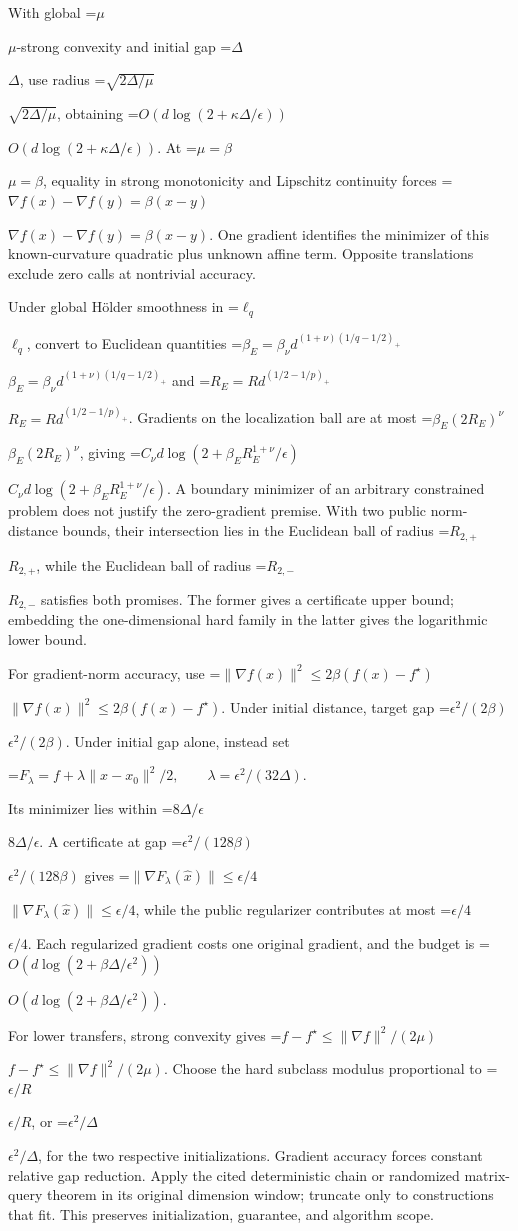 \documentclass[10pt,a4paper]{article}
\newcommand{\AtlasMath}[1]{\par\begingroup\centering\setbox0=\hbox{$\displaystyle #1$}\ifdim\wd0>1.4\linewidth\typeout{ATLAS WIDE FORMULA: \the\wd0}\fi\ifdim\wd0>\linewidth\resizebox{\linewidth}{!}{\box0}\else\box0\fi\par\endgroup}
\newcommand{\AtlasInlineMath}[1]{\begingroup\setbox0=\hbox{$#1$}\ifdim\wd0>.4\linewidth\endgroup\AtlasMath{#1}\else\endgroup$#1$\fi}
\begin{document}
With global \AtlasInlineMath{\mu}-strong convexity and initial gap \AtlasInlineMath{\Delta}, use radius \AtlasInlineMath{\sqrt{2\Delta/\mu}}, obtaining \AtlasInlineMath{O(d\log(2+\kappa\Delta/\epsilon))}. At \AtlasInlineMath{\mu=\beta}, equality in strong monotonicity and Lipschitz continuity forces \AtlasInlineMath{\nabla f(x)-\nabla f(y)=\beta(x-y)}. One gradient identifies the minimizer of this known-curvature quadratic plus unknown affine term. Opposite translations exclude zero calls at nontrivial accuracy.

Under global Hölder smoothness in \AtlasInlineMath{\ell_q}, convert to Euclidean quantities
\AtlasInlineMath{\beta_E=\beta_\nu d^{(1+\nu)(1/q-1/2)_+}} and
\AtlasInlineMath{R_E=Rd^{(1/2-1/p)_+}}. Gradients on the localization ball are at most \AtlasInlineMath{\beta_E(2R_E)^\nu}, giving
\AtlasInlineMath{C_\nu d\log(2+\beta_E R_E^{1+\nu}/\epsilon)}.
A boundary minimizer of an arbitrary constrained problem does not justify the zero-gradient premise. With two public norm-distance bounds, their intersection lies in the Euclidean ball of radius \AtlasInlineMath{R_{2,+}}, while the Euclidean ball of radius \AtlasInlineMath{R_{2,-}} satisfies both promises. The former gives a certificate upper bound; embedding the one-dimensional hard family in the latter gives the logarithmic lower bound.

For gradient-norm accuracy, use \AtlasInlineMath{\|\nabla f(x)\|^2\le2\beta(f(x)-f^\star)}. Under initial distance, target gap \AtlasInlineMath{\epsilon^2/(2\beta)}. Under initial gap alone, instead set

\AtlasMath{F_\lambda=f+\lambda\|x-x_0\|^2/2,\qquad\lambda=\epsilon^2/(32\Delta).}

Its minimizer lies within \AtlasInlineMath{8\Delta/\epsilon}. A certificate at gap \AtlasInlineMath{\epsilon^2/(128\beta)} gives \AtlasInlineMath{\|\nabla F_\lambda(\widehat x)\|\le\epsilon/4}, while the public regularizer contributes at most \AtlasInlineMath{\epsilon/4}. Each regularized gradient costs one original gradient, and the budget is \AtlasInlineMath{O(d\log(2+\beta\Delta/\epsilon^2))}.

For lower transfers, strong convexity gives \AtlasInlineMath{f-f^\star\le\|\nabla f\|^2/(2\mu)}. Choose the hard subclass modulus proportional to \AtlasInlineMath{\epsilon/R}, or \AtlasInlineMath{\epsilon^2/\Delta}, for the two respective initializations. Gradient accuracy forces constant relative gap reduction. Apply the cited deterministic chain or randomized matrix-query theorem in its original dimension window; truncate only to constructions that fit. This preserves initialization, guarantee, and algorithm scope.
\end{document}
